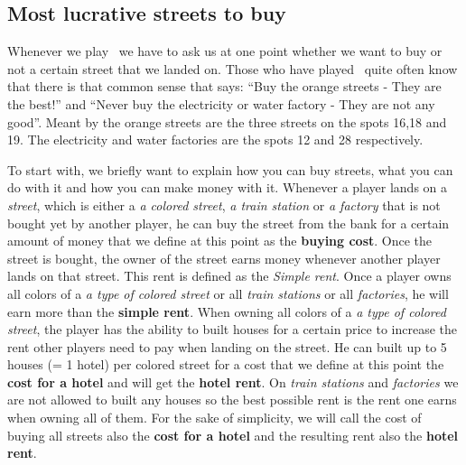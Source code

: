 
\subsection{Most lucrative streets to buy} %
\label{sub:most_lucrative_streets_to_buy}

Whenever we play \monopoly~we have to ask us at one point whether we want to buy or not a certain street 
that we landed on. Those who have played \monopoly~quite often know that there is that common sense that 
says: ``Buy the orange streets - They are the best!'' 
and ``Never buy the electricity or water factory - They are not any good''. 
Meant by the orange streets are the three streets on the spots 16,18 and 19. The electricity and water 
factories are the spots 12 and 28 respectively.

To start with, we briefly want to explain how you can buy streets, what you can do with it and how you can 
make money with it. Whenever a player lands on a \emph{street}, which is either a \emph{a colored street}, 
\emph{a train station} or \emph{a factory} that is not bought yet by another player, he can buy the street 
from the bank for a certain amount of money that we define at this point as the  \textbf{buying cost}.
Once the street is bought, the owner of the street earns money whenever another player lands on that street. 
This rent is defined as the \emph{Simple rent}. 
Once a player owns all colors of a \emph{a type of colored street} or all \emph{train stations} or all 
\emph{factories}, he will earn more than the \textbf{simple rent}. When owning all colors of a \emph{a type 
of colored street}, the player has the ability to built houses for a certain price to increase the rent other 
players need to pay when landing on the street. He can built up to 5 houses (= 1 hotel) per colored street 
for a cost that we define at this point the \textbf{cost for a hotel} and will get the \textbf{hotel rent}.
On \emph{train stations} and \emph{factories} we are not allowed to built any houses so the best possible 
rent is the rent one earns when owning all of them. For the sake of simplicity, we will call the cost of 
buying all streets also the \textbf{cost for a hotel} and the resulting rent also the \textbf{hotel rent}.

